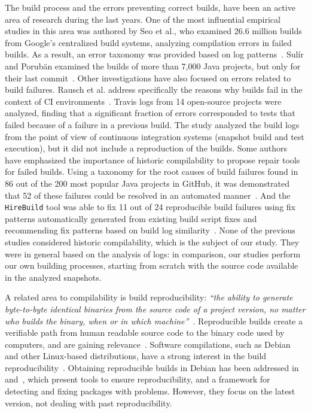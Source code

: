 The build process and the errors preventing correct builds, have been an active area of research during the last years.
One of the most influential empirical studies in this area was authored by Seo et al., who examined 26.6 million builds from Google's centralized build systems, analyzing compilation errors in failed builds. As a result, an error taxonomy was provided based on log patterns~\cite{Seo:2014:PBE:2568225.2568255}.
Sulír and Porubän examined the builds of more than 7,000 Java projects, but only for their last commit~\cite{Sulir:2016:QSJ:3001878.3001882}. 
Other investigations have also focused on errors related to build failures. 
Rausch et al. address specifically the reasons why builds fail in the context of CI environments~\cite{Rausch:2017:EAB:3104188.3104231}.
Travis logs from 14 open-source projects were analyzed, finding that a significant fraction of errors corresponded to tests that failed because of a failure in a previous build.
The study analyzed the build logs from the point of view of continuous integration systems (snapshot build and test execution), but it did not include a reproduction of the builds.
Some authors have emphasized the importance of historic compilability to propose repair tools for failed builds.
Using a taxonomy for the root causes of build failures found in 86 out of the 200 most popular Java projects in GitHub, it was demonstrated that 52 of these failures could be resolved in an automated manner~\cite{hassan2017automatic}.
And the \texttt{HireBuild} tool was able to fix 11 out of 24 reproducible build failures using fix patterns automatically generated from existing build script fixes and recommending fix patterns based on build log similarity~\cite{HireBuild}.
None of the previous studies considered historic compilability, which is the subject of our study. They were in general based on the analysis of logs: in comparison, our studies perform our own building processes, starting from scratch with the source code available in the analyzed snapshots.

A related area to compilability is build reproducibility: \emph{``the ability to generate byte-to-byte identical binaries from the source code of a project version, no matter who builds the binary, when or in which machine''}~\cite{RepBlds:2017:Online}. 
Reproducible builds create a verifiable path from human readable source code to the binary code used by computers, and are gaining relevance~\cite{cito2017empirical,maudoux2018correct,deCarnedeCarnavalet:2014:CIV:2664243.2664288,perry2014reproducible}. 
Software compilations, such as Debian and other Linux-based distributions, have a strong interest in the build reproducibility~\cite{RepBlds:2017:Online,RepBlds:2017:Online}. Obtaining reproducible builds in Debian has been addressed in~\cite{Glukhova:Thesis:2017} and~\cite{Ren:2018:ALU:3180155.3180224}, which present tools to ensure reproducibility, and a framework for detecting and fixing packages with problems. 
However, they focus on the latest version, not dealing with past reproducibility.

